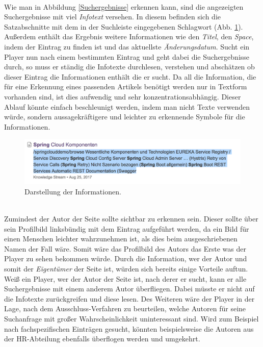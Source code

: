 \documentclass[a4paper,12pt,twoside]{scrartcl}
\begin{document}
\\
Wie man in Abbildung \ref{Suchergebnisse} erkennen kann, sind die angezeigten Suchergebnisse mit viel \textit{Infotext} versehen. In diesem befinden sich die Satzabschnitte mit dem in der Suchleiste eingegebenen Schlagwort (Abb. \ref{Infotext}). Außerdem enthält das Ergebnis weitere Informationen wie den \textit{Titel}, den \textit{Space}, indem der Eintrag zu finden ist und das aktuellste \textit{Änderungsdatum}. Sucht ein Player nun nach einem bestimmten Eintrag und geht dabei die Suchergebnisse durch, so muss er ständig die Infotexte durchlesen, verstehen und abschätzen ob dieser Eintrag die Informationen enthält die er sucht. Da all die Information, die für eine Erkennung eines passenden Artikels benötigt werden nur in Textform vorhanden sind, ist dies aufwendig und sehr konzentrationsabhängig. Dieser Ablauf könnte einfach beschleunigt werden, indem man nicht Texte verwenden würde, sondern aussagekräftigere und leichter zu erkennende Symbole für die Informationen.
\\
\begin{figure}[h!]
\begin{center}
\includegraphics[scale = 0.6]{Bilder/Infotext.png}
\caption{Darstellung der Informationen.}
\label{Infotext}
\end{center}
\end{figure}
\\
Zumindest der Autor der Seite sollte sichtbar zu erkennen sein. Dieser sollte über sein Profilbild linksbündig mit dem Eintrag aufgeführt werden, da ein Bild für einen Menschen leichter wahrzunehmen ist, als dies beim ausgeschriebenen Namen der Fall wäre. Somit wäre das Profilbild des Autors das Erste was der Player zu sehen bekommen würde. Durch die Information, wer der Autor und somit der \textit{Eigentümer} der Seite ist, würden sich bereits einige Vorteile auftun. Weiß ein Player, wer der Autor der Seite ist, nach derer er sucht, kann er alle Suchergebnisse mit einem anderem Autor überfliegen. Dabei müsste er nicht auf die Infotexte zurückgreifen und diese lesen. Des Weiteren wäre der Player in der Lage, nach dem Ausschluss-Verfahren zu beurteilen, welche Autoren für seine Suchanfrage mit großer Wahrscheinlichkeit uninteressant sind. Wird zum Beispiel nach fachspezifischen Einträgen gesucht, könnten beispielsweise die Autoren aus der HR-Abteilung ebenfalls überflogen werden und umgekehrt.
\end{document}
